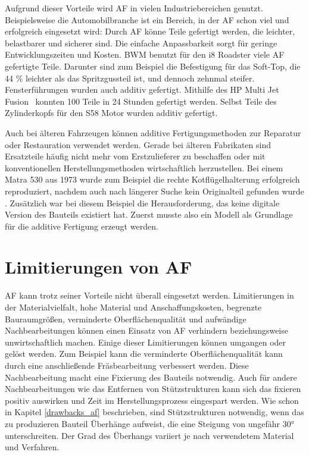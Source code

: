 Aufgrund dieser Vorteile wird AF in vielen Industriebereichen genutzt. 
Beispielsweise die Automobilbranche ist ein Bereich, in der AF schon viel und erfolgreich 
eingesetzt wird:
Durch AF könne Teile gefertigt werden, die leichter, belastbarer und sicherer sind. 
Die einfache Anpassbarkeit sorgt für geringe Entwicklungszeiten und Kosten. 
BWM benutzt für den i8 Roadster viele AF gefertigte Teile.
Darunter sind zum Beispiel die Befestigung für das Soft-Top, die 44 \% leichter als das Spritzgussteil
ist, und dennoch zehnmal steifer.\ \cite{Vafadar.2021} 
Fensterführungen wurden auch additiv gefertigt. Mithilfe des \glqq HP Multi Jet Fusion\grqq~
konnten 
100 Teile in 24 Stunden gefertigt werden. Selbst Teile des Zylinderkopfs für den 
S58 Motor wurden additiv gefertigt. \cite{Anusci.2019}

Auch bei älteren Fahrzeugen können additive Fertigungsmethoden zur 
Reparatur oder Restauration verwendet werden.
Gerade bei älteren Fabrikaten sind Ersatzteile häufig nicht mehr vom 
Erstzulieferer zu beschaffen oder mit konventionellen Herstellungsmethoden
wirtschaftlich herzustellen.
Bei einem Matra 530 aus 1973 wurde zum Beispiel die rechte 
Kotflügelhalterung erfolgreich reproduziert, nachdem auch nach längerer Suche
kein Originalteil gefunden wurde \cite{AMExpo365.03.06.2024}. Zusätzlich war
bei diesem Beispiel die Herausforderung, das keine digitale Version des
Bauteils existiert hat. Zuerst musste also ein Modell als Grundlage für die
additive Fertigung erzeugt werden.

\section{Limitierungen von AF}

AF kann trotz seiner Vorteile nicht überall eingesetzt werden. Limitierungen 
in der Materialvielfalt, hohe Material und Anschaffungskosten, begrenzte
Bauraumgrößen, verminderte Oberflächenqualität und aufwändige Nachbearbeitungen
können einen Einsatz von AF verhindern beziehungsweise unwirtschaftlich machen. 
\cite{inproceedings}
Einige dieser Limitierungen können umgangen oder gelöst werden. 
Zum Beispiel kann die
verminderte Oberflächenqualität kann durch eine anschließende Fräsbearbeitung
verbessert werden. 
Diese Nachbearbeitung macht eine Fixierung des Bauteils notwendig. Auch für andere
Nachbearbeitungen wie das Entfernen von Stützstrukturen kann sich das fixieren
positiv auswirken und Zeit im Herstellungsprozess eingespart werden.
Wie schon in Kapitel \ref{drawbacks_af} beschrieben, sind 
Stützstrukturen notwendig, wenn das zu produzieren Bauteil Überhänge aufweist,
die eine Steigung von ungefähr 30° unterschreiten. Der Grad des Überhangs 
variiert je nach verwendetem Material und Verfahren.

